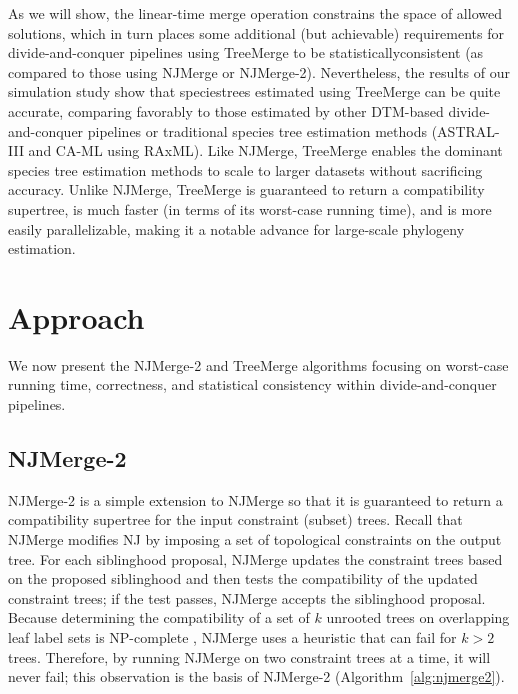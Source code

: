 As we will show, the linear-time merge operation constrains the space of allowed solutions, which in turn places some additional (but achievable) requirements for divide-and-conquer pipelines using TreeMerge to be \gls{statisticallyconsistent} (as compared to those using NJMerge or NJMerge-2).
Nevertheless, the results of our simulation study show that \glspl{speciestree} estimated using TreeMerge can be quite accurate, comparing favorably to those estimated by other DTM-based divide-and-conquer pipelines or traditional species tree estimation methods (\gls{ASTRAL}-III and \gls{CA-ML} using \gls{RAxML}).
Like NJMerge, TreeMerge enables the dominant species tree estimation methods to scale to larger datasets without sacrificing accuracy.
Unlike NJMerge, TreeMerge is guaranteed to return a compatibility supertree, is much faster (in terms of its worst-case running time), and is more easily parallelizable, making it a notable advance for large-scale \gls{phylogeny} estimation.

\section{Approach}
\label{sec:approach}
We now present the NJMerge-2 and TreeMerge algorithms focusing on worst-case running time, correctness, and statistical consistency within divide-and-conquer pipelines.

\subsection{NJMerge-2} 
NJMerge-2 is a simple extension to NJMerge so that it is guaranteed to return a compatibility supertree for the input constraint (subset) trees.
Recall that NJMerge modifies \gls{NJ} by imposing a set of topological constraints on the output tree.
For each siblinghood proposal, NJMerge updates the constraint trees based on the proposed siblinghood and then tests the compatibility of the updated constraint trees; if the test passes, NJMerge accepts the siblinghood proposal.
Because determining the compatibility of a set of  $k$ unrooted trees on overlapping leaf label sets is NP-complete \cite{steel1992complexity}, NJMerge uses a heuristic that can fail for $k > 2$ trees.
Therefore, by running NJMerge on two constraint trees at a time, it will never fail; this observation is the basis of NJMerge-2 (Algorithm~\ref{alg:njmerge2}). 

